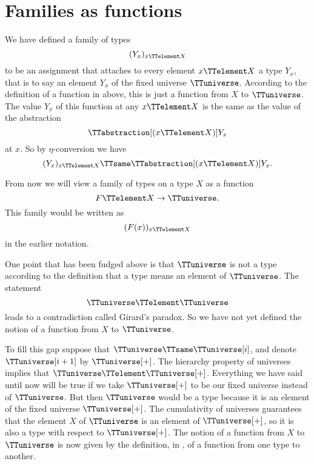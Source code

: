 \documentclass{article}
\begin{document}
\section{Families as functions}
\label{sec:famil-as-funct}

We have defined a family of types
\begin{equation*}
  (Y_x)_{x \TTelement X}
\end{equation*}
to be an assignment that attaches to every element $x \TTelement X$ a
type $Y_x$, that is to say an element $Y_x$ of the fixed universe
$\TTuniverse$.  According to the definition of a function in
 above, this is just a function from $X$ to
$\TTuniverse$.  The value $Y_x$ of this function at any
$x \TTelement X$ is the same as the value of the abstraction
\begin{equation*}
  \TTabstraction[(x \TTelement X)] Y_x
\end{equation*}
at $x$.  So by $\eta$-conversion we have
\begin{equation*}
  (Y_x)_{x \TTelement X} \TTsame \TTabstraction[(x \TTelement X)] Y_x.
\end{equation*}

From now we will view a family of types on a type $X$ as a function
\begin{equation*}
  F \TTelement X \to \TTuniverse.
\end{equation*}
This family would be written as
\begin{equation*}
  (F(x))_{x \TTelement X}
\end{equation*}
in the earlier notation.

One point that has been fudged above is that $\TTuniverse$ is not a
type according to the definition that a type means an element of
$\TTuniverse$.  The statement
\begin{equation*}
  \TTuniverse \TTelement \TTuniverse
\end{equation*}
leads to a contradiction called Girard's paradox.  So we have not yet
defined the notion of a function from $X$ to $\TTuniverse$.

To fill this gap suppose that $\TTuniverse \TTsame \TTuniverse[i]$,
and denote $\TTuniverse[i+1]$ by $\TTuniverse[+]$.  The hierarchy
property of universes implies that
$\TTuniverse \TTelement \TTuniverse[+]$.  Everything we have said
until now will be true if we take $\TTuniverse[+]$ to be our fixed
universe instead of $\TTuniverse$.  But then $\TTuniverse$ would be a
type because it is an element of the fixed universe $\TTuniverse[+]$.
The cumulativity of universes guarantees that the element $X$ of
$\TTuniverse$ is an element of $\TTuniverse[+]$, so it is also a type
with respect to $\TTuniverse[+]$.  The notion of a function from $X$
to $\TTuniverse$ is now given by the definition, in
, of a function from one type to another.
\end{document}
